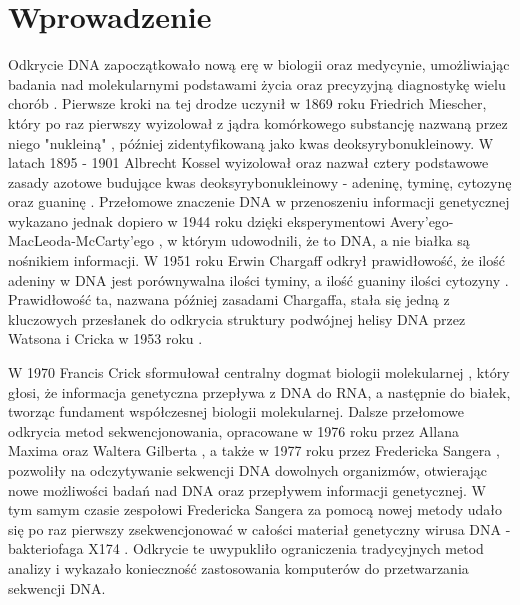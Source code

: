 \cleardoublepage


\section{Wprowadzenie}

Odkrycie DNA zapoczątkowało nową erę w biologii oraz medycynie, umożliwiając badania
nad molekularnymi podstawami życia oraz precyzyjną 
diagnostykę wielu chorób \cite{Louie:2000}. Pierwsze kroki na tej drodze uczynił w 1869 roku 
Friedrich Miescher, który po raz pierwszy wyizolował z jądra komórkowego substancję 
nazwaną przez niego "nukleiną" \cite{Dahm:2005}, później zidentyfikowaną jako kwas deoksyrybonukleinowy. 
W latach 1895 - 1901 Albrecht Kossel wyizolował oraz nazwał cztery podstawowe zasady 
azotowe budujące kwas deoksyrybonukleinowy - adeninę, tyminę, cytozynę oraz guaninę \cite{Kossel:1893}.
Przełomowe znaczenie DNA w przenoszeniu informacji genetycznej wykazano jednak dopiero 
w 1944 roku dzięki eksperymentowi Avery'ego-MacLeoda-McCarty'ego \cite{Avery:1944}, w którym udowodnili, 
że to DNA, a nie białka są nośnikiem informacji. 
W 1951 roku Erwin Chargaff odkrył prawidłowość, że ilość adeniny w DNA jest porównywalna
ilości tyminy, a ilość guaniny ilości cytozyny \cite{Chargaff:1952}. Prawidłowość ta, nazwana później zasadami
Chargaffa, stała się jedną z kluczowych przesłanek do odkrycia struktury podwójnej helisy 
DNA przez Watsona i Cricka w 1953 roku \cite{Watson:1953}.

W 1970 Francis Crick sformułował centralny dogmat biologii molekularnej \cite{Crick:1970}, który głosi,
że informacja genetyczna przepływa z DNA do RNA, a następnie do białek, tworząc 
fundament współczesnej biologii molekularnej. Dalsze przełomowe odkrycia metod sekwencjonowania,
opracowane w 1976 roku przez Allana Maxima oraz Waltera Gilberta \cite{Maxam:1977}, a także w 1977 roku 
przez Fredericka Sangera \cite{Sanger:1977}, pozwoliły na odczytywanie sekwencji DNA dowolnych organizmów, 
otwierając nowe możliwości badań nad DNA oraz przepływem informacji genetycznej. 
W tym samym czasie zespołowi Fredericka Sangera za pomocą nowej metody udało się 
po raz pierwszy zsekwencjonować w całości materiał genetyczny wirusa DNA - 
bakteriofaga  X174 \cite{Sanger:1977_2}. Odkrycie te uwypukliło ograniczenia tradycyjnych metod  %
analizy i wykazało konieczność zastosowania komputerów do przetwarzania sekwencji DNA. \cite{Staden:197 9}


